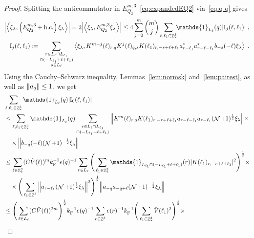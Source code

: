 \documentclass[12pt,a4paper]{article}
\numberwithin{equation}{section}
\newcommand{\1}{\mathbb{I}}
\newcommand{\F}{\mathrm{F}}
\newcommand{\I}{\mathrm{I}}
\DeclareMathOperator{\Z}{\mathbb{Z}}
\DeclareMathOperator{\NN}{\mathcal{N}}
\newcommand{\half}{\frac{1}{2}}
\newcommand{\eva}[1]{\left\langle #1 \right\rangle}
\theoremstyle{plain}
\theoremstyle{definition}
\theoremstyle{remark}
\theoremstyle{plain}
\theoremstyle{definition}
\theoremstyle{remark}
\begin{document}
\begin{proof}
Splitting the anticommutator in $ E^{m,3}_{Q_2} $~\eqref{eq:expandedEQ2} via~\eqref{eq:q-q} gives
\begin{equation} \label{eq:EQ2151}
\begin{aligned}
	\abs{\eva{\xi_\lambda,\left(E^{m,3}_{Q_2}+\mathrm{h.c.}\right) \xi_\lambda }} 
	= 2\abs{\eva{\xi_\lambda, E^{m,3}_{Q_2} \xi_\lambda }}
	\le 4 \sum_{j=0}^m {{m}\choose j} \sum\limits_{\ell,\ell_1 \in \Z^3_*}\!\! \mathds{1}_{L_\ell}(q) |\I_j(\ell, \ell_1)| \;,\\
	\I_j(\ell, \ell_1)
	\coloneq \sum\limits_{\substack{r\in L_{\ell} \cap L_{\ell_1}\\ \cap (-L_{\ell_1}+\ell+\ell_1)\\ s \in L_{\ell}}} 
		\eva{\xi_\lambda, K^{m-j}(\ell)_{r,q} K^{j}(\ell)_{q,s} K(\ell_1)_{r,-r+\ell+\ell_1} a^*_{r-\ell_1} a^*_{r-\ell-\ell_1} b_{-s}(-\ell) \xi_\lambda} \;. \\
\end{aligned}
\end{equation}
Using the Cauchy--Schwarz inequality, Lemmas~\ref{lem:normsk} and~\ref{lem:pairest}, as well as $ \norm{a_q} \le 1 $, we get
\textcolor{green!30!black}{
\begin{align}
	&\sum_{\ell,\ell_1 \in \Z^3_*} \mathds{1}_{L_\ell}(q) |\I_0(\ell, \ell_1)| \nonumber\\
	&\leq \sum_{\ell,\ell_1 \in \Z^3_*} \mathds{1}_{L_\ell}(q) \sum\limits_{\substack{r\in L_{\ell} \cap L_{\ell_1} \\ \cap (-L_{\ell_1}+\ell+\ell_1)}}
		\norm{K^m(\ell)_{r,q} K(\ell_1)_{r,-r+\ell+\ell_1} a_{r-\ell-\ell_1} a_{r-\ell_1} (\NN+1)^\half \xi_\lambda} \times \nonumber\\
	&\quad \times \norm{ b_{-q}(-\ell) (\NN+1)^{-\half} \xi_\lambda}\nonumber\\
	&\leq \sum_{\ell \in \Z^3_*} (C \hat{V}(\ell))^m 
		k_{\F}^{-1} e(q)^{-1} \sum\limits_{r \in L_\ell}
		\Bigg( \sum_{\ell_1 \in \Z^3_*} \mathds{1}_{L_{\ell_1} \cap (-L_{\ell_1}+\ell+\ell_1) }(r) |K(\ell_1)_{r,-r+\ell+\ell_1}|^2 \Bigg)^{\half} \times \nonumber\\
	&\quad \times \Bigg( \sum_{\ell_1 \in \Z^3} \norm{a_{r-\ell_1} (\NN+1)^\half \xi_\lambda}^2 \Bigg)^{\half}
		\norm{ a_{-q} a_{-q+\ell} (\NN+1)^{-\half} \xi_\lambda}\nonumber\\
	&\leq \Bigg( \sum_{\ell \in L_\ell} (C \hat{V}(\ell))^{2m} \Bigg)^{\half} 
		k_{\F}^{-1} e(q)^{-1} \sum\limits_{r \in \Z^3} e(r)^{-1} k_{\F}^{-1}
		\Bigg( \sum_{\ell_1 \in \Z^3_*} \hat{V}(\ell_1)^2 \Bigg)^{\half} \times \nonumber\\

\end{align}}
\end{proof}
\end{document}
